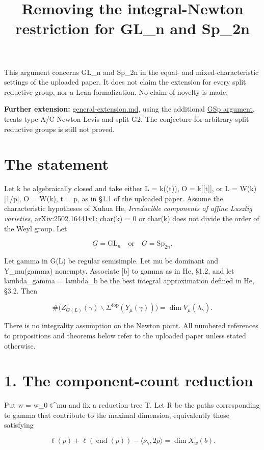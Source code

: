 \documentclass[11pt,a4paper]{article}
\title{Removing the integral-Newton restriction for GL\_n and Sp\_2n}
\author{}
\date{}
\begin{document}
\maketitle
This argument concerns GL\_n and Sp\_2n in the equal- and
mixed-characteristic settings of the uploaded paper. It does not claim
the extension for every split reductive group, nor a Lean formalization.
No claim of novelty is made.

\textbf{Further extension:} \url{general-extension.md}, using the
additional \href{gsp-proof.md}{GSp argument}, treats type-A/C Newton
Levis and split G2. The conjecture for arbitrary split reductive groups
is still not proved.

\section{The statement}\label{the-statement}

Let k be algebraically closed and take either L = k((t)), O =
k{[}{[}t{]}{]}, or L = W(k){[}1/p{]}, O = W(k), t = p, as in §1.1 of the
uploaded paper. Assume the characteristic hypotheses of Xuhua He,
\emph{Irreducible components of affine Lusztig varieties},
arXiv:2502.16441v1: char(k) = 0 or char(k) does not divide the order of
the Weyl group. Let

\[
 G=\mathrm{GL}_n\quad\text{or}\quad G=\mathrm{Sp}_{2n}.
\]

Let gamma in G(L) be regular semisimple. Let mu be dominant and
Y\_mu(gamma) nonempty. Associate {[}b{]} to gamma as in He, §1.2, and
let lambda\_gamma = lambda\_b be the best integral approximation defined
in He, §3.2. Then

\[
 \boxed{\#\bigl(Z_{G(L)}(\gamma)\backslash
 \Sigma^{\mathrm{top}}(Y_\mu(\gamma))\bigr)
 =\dim V_\mu(\lambda_\gamma).}
\]

There is no integrality assumption on the Newton point. All numbered
references to propositions and theorems below refer to the uploaded
paper unless stated otherwise.

\section{1. The component-count
reduction}\label{the-component-count-reduction}

Put w = w\_0 t\^{}mu and fix a reduction tree T. Let R be the paths
corresponding to gamma that contribute to the maximal dimension,
equivalently those satisfying

\[
 \ell(p)+\ell(\operatorname{end}(p))
 -\langle\nu_\gamma,2\rho\rangle=\dim X_w(b).
\]
\end{document}
